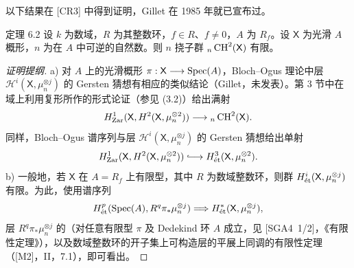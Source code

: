 以下结果在 [CR3] 中得到证明，Gillet 在 1985 年就已宣布过。
\begin{statement}{定理 6.2}
设 $k$ 为数域，$R$ 为其整数环，$f\in R$、$f\ne0$，$A$ 为 $R_f$。设 $\mathsf X$ 为光滑 $A$ 概形，$n$ 为在 $A$ 中可逆的自然数。则 $n$ 挠子群 ${}_n\operatorname{CH}^2(\mathsf X)$ 有限。
\end{statement}
\begin{proof}[证明提纲]
a) 对  $A$ 上的光滑概形 $\pi:\mathsf X\longrightarrow\operatorname{Spec}(A)$，Bloch--Ogus 理论中层 $\mathcal H^i(\mathsf X,\mu_n^{\otimes j})$ 的 Gersten 猜想有相应的类似结论（Gillet，未发表）。第 3 节中在域上利用复形所作的形式论证（参见 (3.2)）给出满射
\[
H^1_{\mathrm{Zar}}(\mathsf X,H^2(\mathsf X,\mu_n^{\otimes2}))\longrightarrow{}_n\operatorname{CH}^2(\mathsf X).
\]
同样，Bloch--Ogus 谱序列与层 $\mathcal H^i(\mathsf X,\mu_n^{\otimes j})$ 的 Gersten 猜想给出单射
\[
H^1_{\mathrm{Zar}}(\mathsf X,\mathcal H^2(\mathsf X,\mu_n^{\otimes2}))\lhook\joinrel\longrightarrow H^3_{\et}(\mathsf X,\mu_n^{\otimes2}).
\]
b) 一般地，若 $\mathsf X$ 在 $A=R_f$ 上有限型，其中 $R$ 为数域整数环，则群 $H^i_{\mathrm{\acute et}}(\mathsf X,\mu_n^{\otimes j})$ 有限。为此，使用谱序列
\[
H^p_{\mathrm{\acute et}}(\operatorname{Spec}(A),R^q\pi_*\mu_n^{\otimes j})\Longrightarrow H^*_{\mathrm{\acute et}}(\mathsf X,\mu_n^{\otimes j}),
\]
层 $R^q\pi_*\mu_n^{\otimes j}$ 的（对任意有限型 $\pi$ 及 Dedekind 环 $A$ 成立，见 [SGA4~1/2]，《有限性定理》），以及数域整数环的开子集上可构造层的平展上同调的有限性定理（[M2]，II，7.1），即可看出。
\end{proof}

